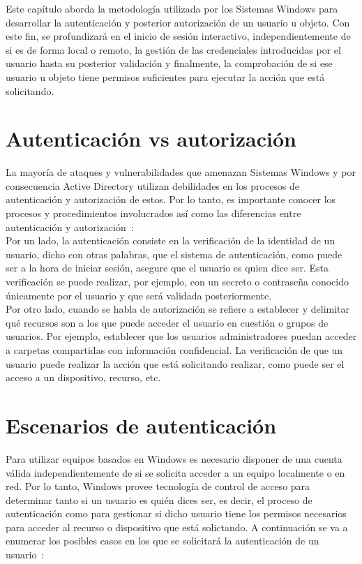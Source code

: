 Este capítulo aborda la metodología utilizada por los Sistemas Windows para desarrollar la autenticación y posterior autorización de un usuario u objeto. Con este fin, se pro\-fun\-di\-za\-rá en el inicio de sesión interactivo, independientemente de si es de forma local o remoto, la gestión de las credenciales introducidas por el usuario hasta su posterior validación y finalmente, la comprobación de si ese usuario u objeto tiene permisos suficientes para ejecutar la acción que está solicitando. 

\section{Autenticación vs autorización}

La mayoría de ataques y vulnerabilidades que amenazan Sistemas Windows y por consecuencia Active Directory utilizan debilidades en los procesos de autenticación y autorización de estos. Por lo tanto, es importante conocer los procesos y procedimientos involucrados así como las diferencias entre autenticación y autorización~\cite{Capitulo2:AuthenticationConcepts}: \\

Por un lado, la autenticación consiste en la verificación de la identidad de un usuario, dicho con otras palabras, que el sistema de autenticación, como puede ser a la hora de iniciar sesión, asegure que el usuario es quien dice ser. Esta verificación se puede realizar, por ejemplo, con un secreto o contraseña conocido únicamente por el usuario y que será validada posteriormente. \\

Por otro lado, cuando se habla de autorización se refiere a establecer y delimitar qué recursos son a los que puede acceder el usuario en cuestión o grupos de usuarios. Por ejemplo, establecer que los usuarios administradores puedan acceder a carpetas compartidas con información confidencial. La verificación de que un usuario puede realizar la acción que está solicitando realizar, como puede ser el acceso a un dispositivo, recurso, etc. 


\section{Escenarios de autenticación}

Para utilizar equipos basados en Windows es necesario disponer de una cuenta válida independientemente de si se solicita acceder a un equipo localmente o en red. Por lo tanto, Windows provee tecnología de control de acceso para determinar tanto si un usuario es quién dices ser, es decir, el proceso de autenticación como para gestionar  si dicho usuario tiene los permisos necesarios para acceder al recurso o dispositivo que está solictando. A continuación se va a enumerar los posibles casos en los que se solicitará la autenticación de un usuario~\cite{Capitulo2:Scenarios}:

